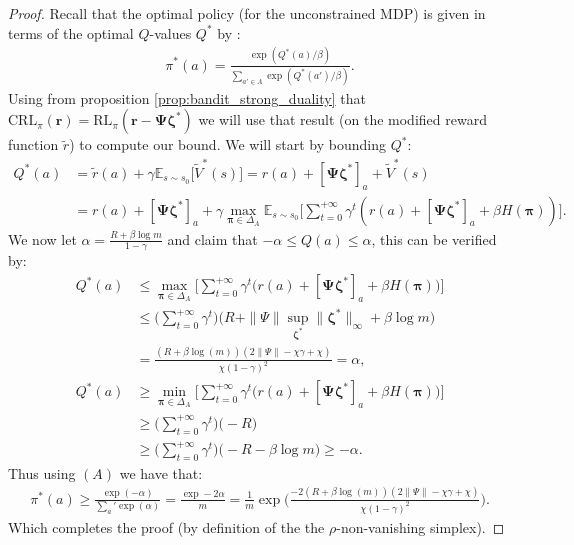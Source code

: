 \begin{proof}
    Recall that the optimal policy (for the unconstrained MDP) is given in terms of the optimal $Q$-values $Q^*$ by : 
    \begin{align*}
        \pi^*(a) = \frac{\exp(Q^*(a)/\beta)}{\sum_{a'\in A}\exp(Q^*(a')/\beta)}. \tag{A}
    \end{align*}
    Using from proposition \ref{prop:bandit_strong_duality} that $\text{CRL}_\pi(\bm{r}) = \text{RL}_\pi(\bm{r} - \bm{\Psi} \bm{\zeta}^*)$ we will use that result (on the modified reward function $\tilde{r}$) to compute our bound. We will start by bounding $Q^*$:
    \begin{align*}
        Q^*(a) &= \tilde{r}(a) + \gamma \mathbb{E}_{s \sim s_0} \Big[ \tilde{V}^*(s) \Big] 
        = r(a) + [\bm{\Psi} \bm{\zeta}^*]_a + \tilde{V}^*(s) \\
        & =  r(a) + [\bm{\Psi} \bm{\zeta}^*]_a  + \gamma  \max_{\bm{\pi}\in \Delta_A} \mathbb{E}_{s \sim s_0} \Big[ \sum_{t=0}^{+\infty} \gamma^t ( r(a) + [\bm{\Psi} \bm{\zeta}^*]_a +\beta H(\bm{\pi})) \Big].
    \end{align*}
    We now let $\alpha = \frac{R + \beta \log m}{1-\gamma}$ and claim that $-\alpha \leq Q(a) \leq \alpha$, this can be verified by:
    \begin{align*}
        Q^*(a) &\leq \max_{\bm{\pi}\in \Delta_A} \Bigg[ \sum_{t=0}^{+\infty} \gamma^t \bigl( r(a)+ [\bm{\Psi} \bm{\zeta}^*]_a + \beta H(\bm{\pi}) \bigr) \Bigg]\\
        &\leq  \Big( \sum_{t=0}^{+\infty} \gamma^t \Big) \Big( R + \| \Psi \| \sup_{\bm{\zeta}^*} \|\bm{\zeta}^*\|_\infty + \beta \log m \Big)\\
        &= \frac{\left(R + \beta \log{\left(m \right)}\right) \left(2  \|\Psi\| - \chi \gamma + \chi\right)}{\chi \left(1- \gamma\right)^{2}}
        = \alpha,\\
        Q^*(a) &\geq \min_{\bm{\pi}\in \Delta_A} \Bigg[ \sum_{t=0}^{+\infty} \gamma^t \bigl( r(a) + [\bm{\Psi} \bm{\zeta}^*]_a  + \beta H(\bm{\pi}) \bigr) \Bigg]\\
        &\geq  \Big( \sum_{t=0}^{+\infty} \gamma^t \Big) \Big( -R \Big)
        \\ &\geq  \Big( \sum_{t=0}^{+\infty} \gamma^t \Big) \Big( -R - \beta \log m \Big) \geq -\alpha.
    \end{align*}
    Thus using $(A)$ we have that:
    \begin{align*}
        \pi^*(a) \geq \frac{\exp(-\alpha)}{\sum_a' \exp(\alpha)} 
        = \frac{\exp -2 \alpha}{m} 
        = \frac{1}{m} \exp \Bigg(\frac{-2\left(R + \beta \log{\left(m \right)}\right) \left(2  \|\Psi\| - \chi \gamma + \chi\right)}{\chi \left(1- \gamma\right)^{2}} \Bigg).
    \end{align*}
    Which completes the proof (by definition of the the $\rho$-non-vanishing simplex).
\end{proof}


